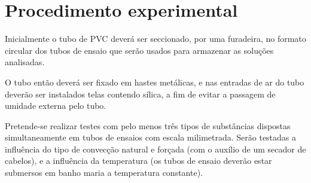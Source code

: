 \section{Procedimento experimental}

Inicialmente o tubo de PVC deverá ser seccionado, por uma furadeira, no formato
circular dos tubos de ensaio que serão usados para armazenar as soluções
analisadas.

O tubo então deverá ser fixado em hastes metálicas, e nas entradas de ar do tubo
deverão ser instalados telas contendo sílica, a fim de evitar a passagem de
umidade externa pelo tubo.

Pretende-se realizar testes com pelo menos três tipos de substâncias dispostas
simultaneamente em tubos de ensaios com escala milimetrada. Serão testadas a
influência do tipo de convecção natural e forçada (com o auxílio de um secador
de cabelos), e a influência da temperatura (os tubos de ensaio deverão estar
submersos em banho maria a temperatura constante).


